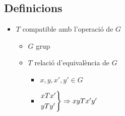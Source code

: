 \documentclass{article}
\begin{document}
\subsection*{Definicions}
\begin{itemize}
\item $T$ compatible amb l'operació de $G$
	\begin{itemize}
	\item $G$ grup
	\item $T$ relació d'equivalència de $G$
		\begin{itemize}
		\item $x, y, x', y' \in G$
		\item 	$
			\begin{rcases}
			xTx'\\yTy'
			\end{rcases}
			\Rightarrow xyTx'y'
			$
		\end{itemize}
	\end{itemize}
\end{itemize}
\end{document}
